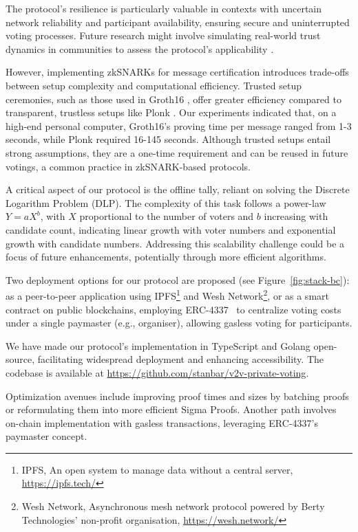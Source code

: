 \documentclass[runningheads]{llncs}
\begin{document}
The protocol's resilience is particularly valuable in contexts with uncertain network reliability and participant availability, ensuring secure and uninterrupted voting processes. Future research might involve simulating real-world trust dynamics in communities to assess the protocol's applicability \cite{healdMathematicalDescriptionTrust2019}.

However, implementing zkSNARKs for message certification introduces trade-offs between setup complexity and computational efficiency. Trusted setup ceremonies, such as those used in Groth16 \cite{grothSizePairingbasedNoninteractive2016}, offer greater efficiency compared to transparent, trustless setups like Plonk \cite{gabizonPlonkPermutationsLagrangebases2019a}. Our experiments indicated that, on a high-end personal computer, Groth16's proving time per message ranged from 1-3 seconds, while Plonk required 16-145 seconds. Although trusted setups entail strong assumptions, they are a one-time requirement and can be reused in future votings, a common practice in zkSNARK-based protocols.

A critical aspect of our protocol is the offline tally, reliant on solving the Discrete Logarithm Problem (DLP). The complexity of this task follows a power-law \( Y = aX^b \), with \( X \) proportional to the number of voters and \( b \) increasing with candidate count, indicating linear growth with voter numbers and exponential growth with candidate numbers. Addressing this scalability challenge could be a focus of future enhancements, potentially through more efficient algorithms.

Two deployment options for our protocol are proposed (see Figure~\ref{fig:stack-bc}): as a peer-to-peer application using IPFS\footnote{IPFS, An open system to manage data without a central server, \url{https://ipfs.tech/}} and Wesh Network\footnote{Wesh Network, Asynchronous mesh network protocol powered by Berty Technologies’ non-profit organisation, \url{https://wesh.network/}}, or as a smart contract on public blockchains, employing ERC-4337~\cite{ERC4337AccountAbstraction} to centralize voting costs under a single paymaster (e.g., organiser), allowing gasless voting for participants.

We have made our protocol's implementation in TypeScript and Golang open-source, facilitating widespread deployment and enhancing accessibility. The codebase is available at \url{https://github.com/stanbar/v2v-private-voting}.

Optimization avenues include improving proof times and sizes by batching proofs or reformulating them into more efficient Sigma Proofs. Another path involves on-chain implementation with gasless transactions, leveraging ERC-4337's paymaster concept.
\end{document}
